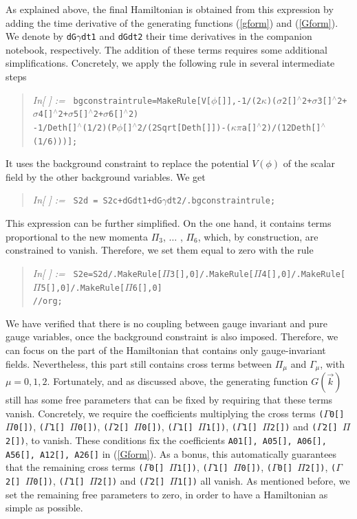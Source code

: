 \documentclass[11pt,tightenlines,eqsecnum,floats,aps,amsmath,amssymb,nofootinbib,prd,floatfix]{revtex4}
\newcommand{\<}{\langle}
\renewcommand{\>}{\rangle}
\newcounter{inout}
\newcommand{\inoutput}{%
	\stepcounter{inout}%
	\theinout}
\newcommand{\mathIn}[1]{
	\begin{quotation}\hspace*{-2.5cm} {\em In[\inoutput] :=\ } {\tt #1} \end{quotation}}
\begin{document}
%
As explained above, the final Hamiltonian is obtained from this expression by adding the time derivative of the generating functions (\ref{gform}) and (\ref{Gform}). We denote by {\tt dG$\gamma$dt1} and {\tt dGdt2} their time derivatives in the companion notebook, respectively. The addition of these terms requires some additional simplifications. Concretely, we apply the following rule in several intermediate steps
%
\mathIn{bgconstraintrule=MakeRule[{V[$\phi$[]],-1/(2$\kappa$)($\sigma$2[]$^{\wedge}$2+$\sigma$3[]$^{\wedge}$2+$\sigma$4[]$^{\wedge}$2+$\sigma$5[]$^{\wedge}$2+$\sigma$6[]$^{\wedge}$2)\\
-1/Deth[]$^{\wedge}$(1/2)(P$\phi$[]$^{\wedge}$2/(2Sqrt[Deth[]])-($\kappa$$\pi$a[]$^{\wedge}$2)/(12Deth[]$^{\wedge}$(1/6)))}];}
%
It uses  the background constraint to  replace the potential $V(\phi)$ of the scalar field by the other background variables. We get
%
\mathIn{S2d = S2c+dGdt1+dG$\gamma$dt2/.bgconstraintrule;}
%
This expression can be further simplified. On the one hand, it contains terms proportional to the new momenta $\Pi_3$, $\ldots$ , $\Pi_6$, which, by construction, are constrained to vanish. Therefore, we set them equal to zero with the rule
%
\mathIn{S2e=S2d/.MakeRule[{$\Pi$3[],0}]/.MakeRule[{$\Pi$4[],0}]/.MakeRule[{$\Pi$5[],0}]/.MakeRule[{$\Pi$6[],0}]\\
//org;}
%

We have verified that there is no coupling between gauge invariant and pure gauge variables, once the background constraint is also imposed. Therefore, we can focus on the part of the Hamiltonian that contains only gauge-invariant fields. Nevertheless, this part still contains cross terms between $\Pi_\mu$ and $\Gamma_\mu$, with $\mu=0,1,2$. Fortunately, and as discussed above, the generating function $G(\vec k)$ still has some free parameters that can  be fixed by requiring that these terms vanish. Concretely, we require the coefficients multiplying the cross terms {\tt ($\Gamma$0[] $\Pi$0[])}, {\tt ($\Gamma$1[] $\Pi$0[])}, {\tt ($\Gamma$2[] $\Pi$0[])}, {\tt ($\Gamma$1[] $\Pi$1[])}, {\tt ($\Gamma$1[] $\Pi$2[])} and {\tt ($\Gamma$2[] $\Pi$2[])}, to vanish. These conditions fix the coefficients {\tt A01[], A05[], A06[], A56[], A12[], A26[]} in (\ref{Gform}). As a bonus, this automatically guarantees that the remaining cross terms {\tt ($\Gamma$0[] $\Pi$1[])}, {\tt ($\Gamma$1[] $\Pi$0[])}, {\tt ($\Gamma$0[] $\Pi$2[])}, {\tt ($\Gamma$2[] $\Pi$0[])}, {\tt ($\Gamma$1[] $\Pi$2[])} and {\tt ($\Gamma$2[] $\Pi$1[])} all vanish. As mentioned before, we set the remaining free parameters to zero, in order to have a  Hamiltonian as simple as possible. 
\end{document}
